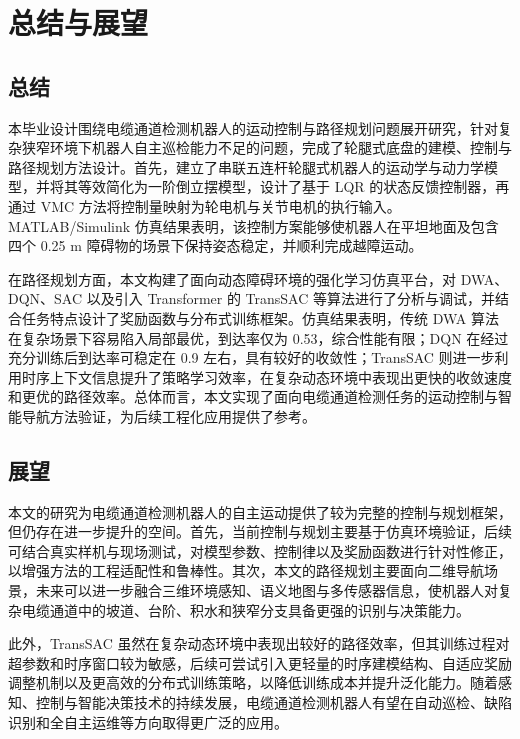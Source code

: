 \chapter{总结与展望}\label{chap:conclusion}
\section{总结}
本毕业设计围绕电缆通道检测机器人的运动控制与路径规划问题展开研究，针对复杂狭窄环境下机器人自主巡检能力不足的问题，完成了轮腿式底盘的建模、控制与路径规划方法设计。首先，建立了串联五连杆轮腿式机器人的运动学与动力学模型，并将其等效简化为一阶倒立摆模型，设计了基于 LQR 的状态反馈控制器，再通过 VMC 方法将控制量映射为轮电机与关节电机的执行输入。MATLAB/Simulink 仿真结果表明，该控制方案能够使机器人在平坦地面及包含四个 0.25 m 障碍物的场景下保持姿态稳定，并顺利完成越障运动。

在路径规划方面，本文构建了面向动态障碍环境的强化学习仿真平台，对 DWA、DQN、SAC 以及引入 Transformer 的 TransSAC 等算法进行了分析与调试，并结合任务特点设计了奖励函数与分布式训练框架。仿真结果表明，传统 DWA 算法在复杂场景下容易陷入局部最优，到达率仅为 0.53，综合性能有限；DQN 在经过充分训练后到达率可稳定在 0.9 左右，具有较好的收敛性；TransSAC 则进一步利用时序上下文信息提升了策略学习效率，在复杂动态环境中表现出更快的收敛速度和更优的路径效率。总体而言，本文实现了面向电缆通道检测任务的运动控制与智能导航方法验证，为后续工程化应用提供了参考。
\section{展望}
本文的研究为电缆通道检测机器人的自主运动提供了较为完整的控制与规划框架，但仍存在进一步提升的空间。首先，当前控制与规划主要基于仿真环境验证，后续可结合真实样机与现场测试，对模型参数、控制律以及奖励函数进行针对性修正，以增强方法的工程适配性和鲁棒性。其次，本文的路径规划主要面向二维导航场景，未来可以进一步融合三维环境感知、语义地图与多传感器信息，使机器人对复杂电缆通道中的坡道、台阶、积水和狭窄分支具备更强的识别与决策能力。

此外，TransSAC 虽然在复杂动态环境中表现出较好的路径效率，但其训练过程对超参数和时序窗口较为敏感，后续可尝试引入更轻量的时序建模结构、自适应奖励调整机制以及更高效的分布式训练策略，以降低训练成本并提升泛化能力。随着感知、控制与智能决策技术的持续发展，电缆通道检测机器人有望在自动巡检、缺陷识别和全自主运维等方向取得更广泛的应用。